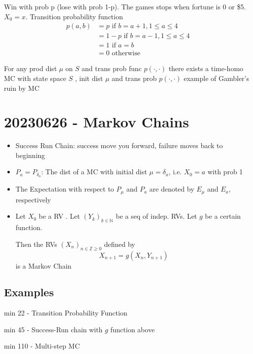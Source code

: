 \documentclass{report}
\begin{document}
\begin{itemize}
{\begin{itemize}
          Win with prob p (lose with prob 1-p).  The games stops when
          fortune is 0 or \$5.  $X_0 = x$.  Transition probability function
          \begin{align}
            p(a,b) &= p \text{ if } b = a+1, 1 \leq a \leq 4 \\
                   &= 1-p \text{ if } b = a-1, 1 \leq a \leq 4 \\
                   &= 1 \text{ if } a=b \\
                   &= 0 \text{ otherwise }
          \end{align}

           {
            For any prod dist $\mu$ on $S$ and trans prob func
            $p(\cdot,\cdot)$ there exists a time-homo MC with state space
            $S$ , init dist $\mu$ and trans prob $p(\cdot,\cdot)$
          }
           {
            example of Gambler's ruin by MC
          }
      \end{itemize}
    }
  \end{itemize}

\chapter*{20230626 - Markov Chains}
  \begin{itemize}
    \item  Success Run Chain: success move you forward, failure moves
      back to beginning
    \item $P_a = P_\delta_a$: The dist of a MC with initial dist
      $\mu = \delta_a$, i.e. $X_0 = a$ with prob 1
    \item The Expectation with respect to $P_{\mu}$ and $P_a$ are
      denoted by $E_{\mu}$ and $E_a$, respectively
    \item Let $X_0$ be a RV .  Let $(Y_k)_{k \in \mathbb{N}}$ be a seq
      of indep. RVs.  Let $g$ be a certain function.

      Then the RVs $(X_n)_{n \in \mathbb{Z} \geq 0}$ defined by 
      \[ X_{n+1} = g(X_n, Y_{n+1}) \]
      is a Markov Chain

  \end{itemize}

  \section{Examples}%
    \item min 22 - Transition Probability Function
    \item min 45 - Success-Run chain with $g$ function above
    \item min 110 - Multi-step MC
  \label{sec:Examples}
  
\end{document}
